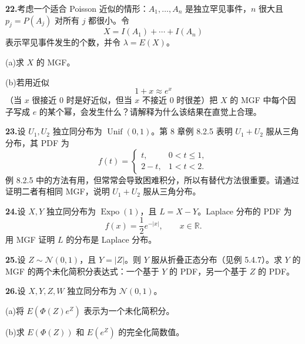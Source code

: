 \documentclass[UTF8,12pt,a4paper,fontset=fandol]{ctexart}
\begin{document}
\noindent\textbf{22.}\quad 考虑一个适合 Poisson 近似的情形：$A_1,\ldots,A_n$ 是独立罕见事件，$n$ 很大且 $p_j=P(A_j)$ 对所有 $j$ 都很小。令
\[
  X=I(A_1)+\cdots+I(A_n)
\]
表示罕见事件发生的个数，并令 $\lambda=E(X)$。

\noindent (a)\quad 求 $X$ 的 MGF。

\noindent (b)\quad 若用近似
\[
  1+x\approx e^x
\]
（当 $x$ 很接近 $0$ 时是好近似，但当 $x$ 不接近 $0$ 时很差）把 $X$ 的 MGF 中每个因子写成 $e$ 的某个幂，会发生什么？请解释为什么该结果在直觉上合理。

\noindent\textbf{23.}\quad 设 $U_1,U_2$ 独立同分布为 $\operatorname{Unif}(0,1)$。第 8 章例 8.2.5 表明 $U_1+U_2$ 服从三角分布，其 PDF 为
\[
  f(t)=
  \begin{cases}
    t,&0<t\le1,\\
    2-t,&1<t<2.
  \end{cases}
\]
例 8.2.5 中的方法有用，但常常会导致困难积分，所以有替代方法很重要。请通过证明二者有相同 MGF，说明 $U_1+U_2$ 服从三角分布。

\noindent\textbf{24.}\quad 设 $X,Y$ 独立同分布为 $\operatorname{Expo}(1)$，且 $L=X-Y$。Laplace 分布的 PDF 为
\[
  f(x)=\frac12e^{-|x|},\qquad x\in\mathbb{R}.
\]
用 MGF 证明 $L$ 的分布是 Laplace 分布。

\noindent\textbf{25.}\quad 设 $Z\sim\mathcal{N}(0,1)$，且 $Y=|Z|$。则 $Y$ 服从折叠正态分布（见例 5.4.7）。求 $Y$ 的 MGF 的两个未化简积分表达式：一个基于 $Y$ 的 PDF，另一个基于 $Z$ 的 PDF。

\noindent\textbf{26.}\quad 设 $X,Y,Z,W$ 独立同分布为 $\mathcal{N}(0,1)$。

\noindent (a)\quad 将 $E(\Phi(Z)e^Z)$ 表示为一个未化简积分。

\noindent (b)\quad 求 $E(\Phi(Z))$ 和 $E(e^Z)$ 的完全化简数值。
\end{document}
